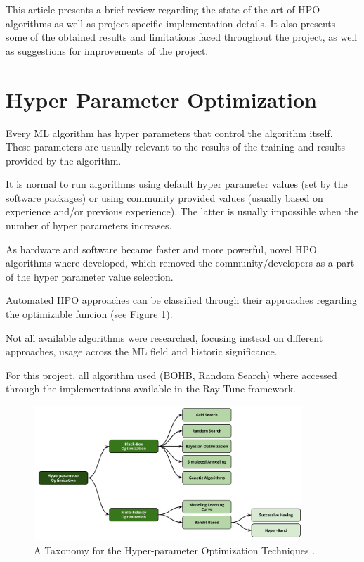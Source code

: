 \documentclass[runningheads]{llncs}
\begin{document}
This article presents a brief review regarding the state of the art of HPO algorithms as well as project specific implementation details. It also presents some of the obtained results and limitations faced throughout the project, as well as suggestions for improvements of the project.

\section{Hyper Parameter Optimization}

Every ML algorithm has hyper parameters that control the algorithm itself. These parameters are usually relevant to the results of the training and results provided by the algorithm.

It is normal to run algorithms using default hyper parameter values (set by the software packages) or using community provided values (usually based on experience and/or previous experience). The latter is usually impossible when the number of hyper parameters increases.

As hardware and software became faster and more powerful, novel HPO algorithms where developed, which removed the community/developers as a part of the hyper parameter value selection.

Automated HPO approaches can be classified through their approaches regarding the optimizable funcion (see Figure \ref{fig:state_of_art_taxonomy}).

Not all available algorithms were researched, focusing instead on different approaches, usage across the ML field and historic significance.

For this project, all algorithm used (BOHB, Random Search) where accessed through the implementations available in the Ray Tune framework.

\begin{figure}
	\centering
	\includegraphics[width=0.90\textwidth]{images/state_art-taxonomy_optimizers.png}
	\caption{A Taxonomy for the Hyper-parameter Optimization Techniques \cite{elshawi2019automated}.}
	\label{fig:state_of_art_taxonomy}
\end{figure}
\end{document}
